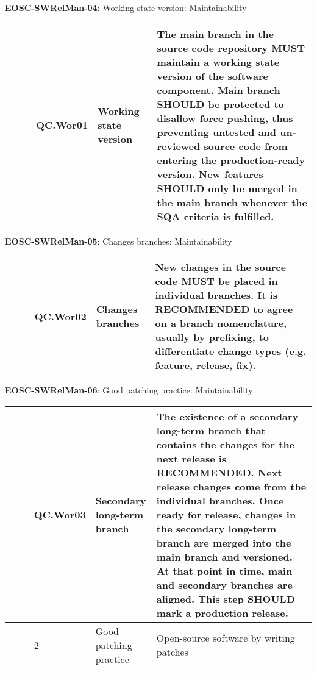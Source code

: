 \textbf{EOSC-SWRelMan-04}: Working state version: Maintainability
\nopagebreak[4]
\begin{center}
    \tabletail{\hline}
    \tiny
    \begin{supertabular}{|p{0.10\linewidth}|p{0.10\linewidth}|p{0.20\linewidth}|p{0.60\linewidth}|} \hline
        \cite{orviz_set_2017} & QC.Wor01 & Working state version & The main branch in the source code repository MUST maintain a working state version of the software component. Main branch SHOULD be protected to disallow force pushing, thus preventing untested and un-reviewed source code from entering the production-ready version. New features SHOULD only be merged in the main branch whenever the SQA criteria is fulfilled.\\ \hline
    \end{supertabular}
\end{center}

\textbf{EOSC-SWRelMan-05}: Changes branches: Maintainability
\nopagebreak[4]
\begin{center}
    \tabletail{\hline}
    \tiny
    \begin{supertabular}{|p{0.10\linewidth}|p{0.10\linewidth}|p{0.20\linewidth}|p{0.60\linewidth}|} \hline
        \cite{orviz_set_2017} & QC.Wor02 & Changes branches & New changes in the source code MUST be placed in individual branches. It is RECOMMENDED to agree on a branch nomenclature, usually by prefixing, to differentiate change types (e.g. feature, release, fix).\\ \hline
    \end{supertabular}
\end{center}

\textbf{EOSC-SWRelMan-06}: Good patching practice: Maintainability
\nopagebreak[4]
\begin{center}
    \tabletail{\hline}
    \tiny
    \begin{supertabular}{|p{0.10\linewidth}|p{0.10\linewidth}|p{0.20\linewidth}|p{0.60\linewidth}|} \hline
        \cite{orviz_set_2017} & QC.Wor03 & Secondary long-term branch & The existence of a secondary long-term branch that contains the changes for the next release is RECOMMENDED. Next release changes come from the individual branches. Once ready for release, changes in the secondary long-term branch are merged into the main branch and versioned. At that point in time, main and secondary branches are aligned. This step SHOULD mark a production release.\\ \hline
        \cite{raymond_software_2013} & 2 & Good patching practice & Open-source software by writing patches\\ \hline
    \end{supertabular}
\end{center}

